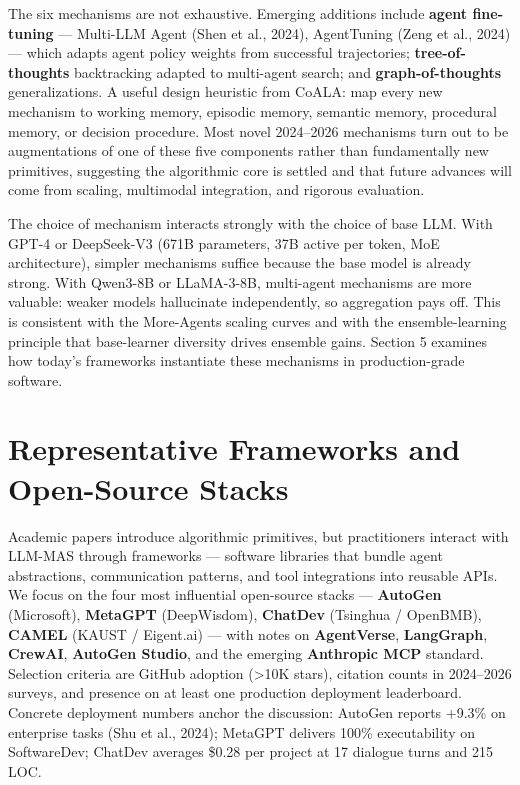 The six mechanisms are not exhaustive. Emerging additions include \textbf{agent fine-tuning} --- Multi-LLM Agent (Shen et al., 2024), AgentTuning (Zeng et al., 2024) --- which adapts agent policy weights from successful trajectories; \textbf{tree-of-thoughts} backtracking adapted to multi-agent search; and \textbf{graph-of-thoughts} generalizations. A useful design heuristic from CoALA: map every new mechanism to working memory, episodic memory, semantic memory, procedural memory, or decision procedure. Most novel 2024--2026 mechanisms turn out to be augmentations of one of these five components rather than fundamentally new primitives, suggesting the algorithmic core is settled and that future advances will come from scaling, multimodal integration, and rigorous evaluation.

The choice of mechanism interacts strongly with the choice of base LLM. With GPT-4 or DeepSeek-V3 (671B parameters, 37B active per token, MoE architecture), simpler mechanisms suffice because the base model is already strong. With Qwen3-8B or LLaMA-3-8B, multi-agent mechanisms are more valuable: weaker models hallucinate independently, so aggregation pays off. This is consistent with the More-Agents scaling curves and with the ensemble-learning principle that base-learner diversity drives ensemble gains. Section 5 examines how today's frameworks instantiate these mechanisms in production-grade software.

\section{Representative Frameworks and Open-Source Stacks}\label{representative-frameworks-and-open-source-stacks}

Academic papers introduce algorithmic primitives, but practitioners interact with LLM-MAS through frameworks --- software libraries that bundle agent abstractions, communication patterns, and tool integrations into reusable APIs. We focus on the four most influential open-source stacks --- \textbf{AutoGen} (Microsoft), \textbf{MetaGPT} (DeepWisdom), \textbf{ChatDev} (Tsinghua / OpenBMB), \textbf{CAMEL} (KAUST / Eigent.ai) --- with notes on \textbf{AgentVerse}, \textbf{LangGraph}, \textbf{CrewAI}, \textbf{AutoGen Studio}, and the emerging \textbf{Anthropic MCP} standard. Selection criteria are GitHub adoption (\textgreater10K stars), citation counts in 2024--2026 surveys, and presence on at least one production deployment leaderboard. Concrete deployment numbers anchor the discussion: AutoGen reports +9.3\% on enterprise tasks (Shu et al., 2024); MetaGPT delivers 100\% executability on SoftwareDev; ChatDev averages \$0.28 per project at 17 dialogue turns and 215 LOC.

